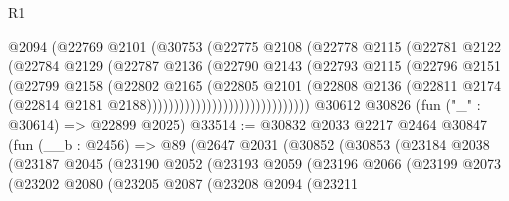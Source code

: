 \begin{lexlean}{R1}
\begin{coremodule}
                                @2094
                                (@22769
                                  @2101
                                  (@30753
                                    (@22775
                                      @2108
                                      (@22778
                                        @2115
                                        (@22781
                                          @2122
                                          (@22784
                                            @2129
                                            (@22787
                                              @2136
                                              (@22790
                                                @2143
                                                (@22793
                                                  @2115
                                                  (@22796
                                                    @2151
                                                    (@22799
                                                      @2158
                                                      (@22802
                                                        @2165
                                                        (@22805
                                                          @2101
                                                          (@22808
                                                            @2136
                                                            (@22811
                                                              @2174
                                                              (@22814
                                                                @2181
                                                                @2188))))))))))))))))))))))))))))))
    @30612
    @30826
    (fun ("_" : @30614) => @22899 @2025)
@33514 := @30832
    @2033
    @2217
    @2464
    @30847
    (fun (__b : @2456) =>
    @89
      (@2647
        @2031
        (@30852
          (@30853
            (@23184
              @2038
              (@23187
                @2045
                (@23190
                  @2052
                  (@23193
                    @2059
                    (@23196
                      @2066
                      (@23199
                        @2073
                        (@23202
                          @2080
                          (@23205
                            @2087
                            (@23208
                              @2094
                              (@23211

\end{coremodule}
\end{lexlean}
